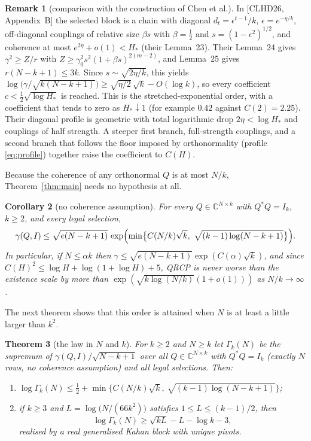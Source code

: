 \documentclass[11pt,a4paper]{article}
\newtheorem{theorem}{Theorem}[section]
\newtheorem{corollary}[theorem]{Corollary}
\theoremstyle{definition}
\newtheorem{remark}[theorem]{Remark}
\numberwithin{equation}{section}
\newcommand{\C}{\mathbb C}
\begin{document}
\begin{remark}[comparison with the construction of Chen et al.]\label{rem:chen}
In [CLHD26, Appendix~B] the selected block is a chain with diagonal $d_t=\epsilon^{t-1}/k$, $\epsilon=e^{-\eta/k}$,
off-diagonal couplings of relative size $\beta s$ with $\beta=\tfrac12$ and $s=(1-\epsilon^2)^{1/2}$, and coherence at
most $e^{2\eta}+o(1)<H_*$ (their Lemma~23). Their Lemma~24 gives $\gamma^2\ge Z/r$ with
$Z\ge\gamma_0^2s^2(1+\beta s)^{2(m-2)}$, and Lemma~25 gives $r(N-k+1)\le3k$. Since $s\sim\sqrt{2\eta/k}$, this yields
$\log\bigl(\gamma/\sqrt{k(N-k+1)}\bigr)\ge\sqrt{\eta/2}\,\sqrt k-O(\log k)$, so every coefficient
$c<\tfrac12\sqrt{\log H_*}$ is reached. This is the stretched-exponential order, with a coefficient that tends to
zero as $H_*\downarrow1$ (for example $0.42$ against $C(2)=2.25$). Their diagonal profile is geometric with total
logarithmic drop $2\eta<\log H_*$ and couplings of half strength. A steeper first branch, full-strength couplings,
and a second branch that follows the floor imposed by orthonormality (profile \eqref{eq:profile}) together raise
the coefficient to $C(H)$.
\end{remark}

Because the coherence of any orthonormal $Q$ is at most $N/k$, Theorem~\ref{thm:main} needs no hypothesis at all.

\begin{corollary}[no coherence assumption]\label{cor:free}
For every $Q\in\C^{N\times k}$ with $Q^*Q=I_k$, $k\ge2$, and every legal selection,
\begin{equation}\label{eq:free}
  \gamma(Q,I)\le\sqrt{e(N-k+1)}\,\exp\Bigl(\min\bigl\{C(N/k)\sqrt k,\ \sqrt{(k-1)\log(N-k+1)}\bigr\}\Bigr).
\end{equation}
In particular, if $N\le\alpha k$ then $\gamma\le\sqrt{e(N-k+1)}\exp(C(\alpha)\sqrt k)$, and since
$C(H)^2\le\log H+\log(1+\log H)+5$, QRCP is never worse than the existence scale by more than
$\exp(\sqrt{k\log(N/k)}(1+o(1)))$ as $N/k\to\infty$.
\end{corollary}

The next theorem shows that this order is attained when $N$ is at least a little larger than $k^2$.

\begin{theorem}[the law in $N$ and $k$]\label{thm:Nk}
For $k\ge2$ and $N\ge k$ let $\Gamma_k(N)$ be the supremum of $\gamma(Q,I)/\sqrt{N-k+1}$ over all $Q\in\C^{N\times k}$
with $Q^*Q=I_k$ (exactly $N$ rows, no coherence assumption) and all legal selections. Then:
\begin{enumerate}
\item[(a)] $\log\Gamma_k(N)\le\tfrac12+\min\{C(N/k)\sqrt k,\ \sqrt{(k-1)\log(N-k+1)}\}$;
\item[(b)] if $k\ge3$ and $L=\log\bigl(N/(66k^2)\bigr)$ satisfies $1\le L\le(k-1)/2$, then
  \begin{equation}\label{eq:Nk-lower}
   \log\Gamma_k(N)\ge\sqrt{kL}-L-\log k-3,
  \end{equation}
  realised by a real generalised Kahan block with unique pivots.
\end{enumerate}
\end{theorem}
\end{document}

